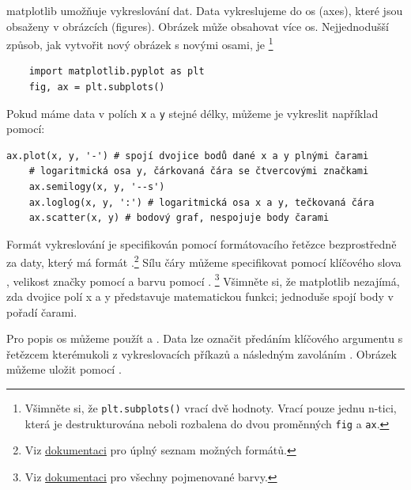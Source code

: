matplotlib umožňuje vykreslování dat. Data vykreslujeme do os (axes), které jsou obsaženy v obrázcích (figures). Obrázek může obsahovat více os. Nejjednodušší způsob, jak vytvořit nový obrázek s novými osami, je \footnote{Všimněte si, že \lstinline{plt.subplots()} vrací dvě hodnoty. Vrací pouze jednu n-tici, která je destrukturována neboli rozbalena do dvou proměnných \lstinline{fig} a \lstinline{ax}.}
\begin{lstlisting}
    import matplotlib.pyplot as plt
    fig, ax = plt.subplots()
\end{lstlisting}
Pokud máme data v polích \lstinline{x} a \lstinline{y} stejné délky, můžeme je vykreslit například pomocí:
\begin{lstlisting}[caption=Základní vykreslování.]
    ax.plot(x, y, '-') # spojí dvojice bodů dané x a y plnými čarami
    # logaritmická osa y, čárkovaná čára se čtvercovými značkami
    ax.semilogy(x, y, '--s')
    ax.loglog(x, y, ':') # logaritmická osa x a y, tečkovaná čára
    ax.scatter(x, y) # bodový graf, nespojuje body čarami
\end{lstlisting}
Formát vykreslování je specifikován pomocí formátovacího řetězce bezprostředně za daty, který má formát .\footnote{Viz \href{https://matplotlib.org/stable/api/_as_gen/matplotlib.pyplot.plot.html}{dokumentaci} pro úplný seznam možných formátů.} Sílu čáry můžeme specifikovat pomocí klíčového slova , velikost značky pomocí  a barvu pomocí . \footnote{Viz \href{https://matplotlib.org/stable/users/explain/colors/colors.html}{dokumentaci} pro všechny pojmenované barvy.} Všimněte si, že matplotlib nezajímá, zda dvojice polí x a y představuje matematickou funkci; jednoduše spojí body v pořadí čarami.

Pro popis os můžeme použít  a . Data lze označit předáním klíčového argumentu  s řetězcem kterémukoli z vykreslovacích příkazů a následným zavoláním . Obrázek můžeme uložit pomocí .

